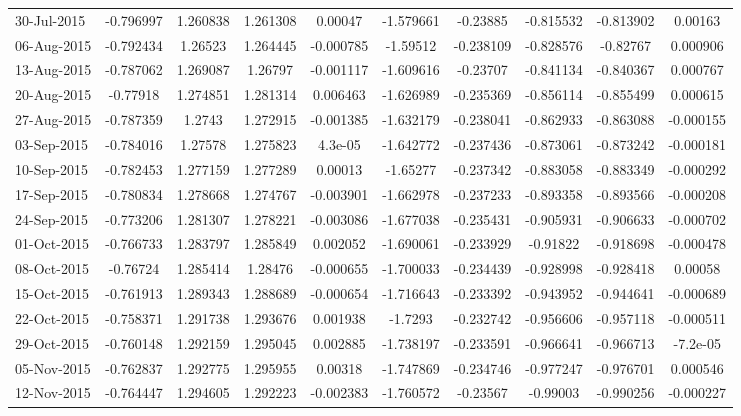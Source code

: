 \documentclass[letterpaper,11pt]{article}
\newcommand{\?}{\stackrel{?}{=}}
\begin{document}
\begin{table}[htbp]
\begin{adjustbox}{width=1.2\textwidth,center=\textwidth}
\begin{tabular}{ l  *9c }
30-Jul-2015 & -0.796997 & 1.260838 & 1.261308 & 0.00047 & -1.579661 & -0.23885 & -0.815532 & -0.813902 & 0.00163 \\
\rowcolor{black!10}06-Aug-2015 & -0.792434 & 1.26523 & 1.264445 & -0.000785 & -1.59512 & -0.238109 & -0.828576 & -0.82767 & 0.000906 \\
13-Aug-2015 & -0.787062 & 1.269087 & 1.26797 & -0.001117 & -1.609616 & -0.23707 & -0.841134 & -0.840367 & 0.000767 \\
\rowcolor{black!10}20-Aug-2015 & -0.77918 & 1.274851 & 1.281314 & 0.006463 & -1.626989 & -0.235369 & -0.856114 & -0.855499 & 0.000615 \\
27-Aug-2015 & -0.787359 & 1.2743 & 1.272915 & -0.001385 & -1.632179 & -0.238041 & -0.862933 & -0.863088 & -0.000155 \\
\rowcolor{black!10}03-Sep-2015 & -0.784016 & 1.27578 & 1.275823 & 4.3e-05 & -1.642772 & -0.237436 & -0.873061 & -0.873242 & -0.000181 \\
10-Sep-2015 & -0.782453 & 1.277159 & 1.277289 & 0.00013 & -1.65277 & -0.237342 & -0.883058 & -0.883349 & -0.000292 \\
\rowcolor{black!10}17-Sep-2015 & -0.780834 & 1.278668 & 1.274767 & -0.003901 & -1.662978 & -0.237233 & -0.893358 & -0.893566 & -0.000208 \\
24-Sep-2015 & -0.773206 & 1.281307 & 1.278221 & -0.003086 & -1.677038 & -0.235431 & -0.905931 & -0.906633 & -0.000702 \\
\rowcolor{black!10}01-Oct-2015 & -0.766733 & 1.283797 & 1.285849 & 0.002052 & -1.690061 & -0.233929 & -0.91822 & -0.918698 & -0.000478 \\
08-Oct-2015 & -0.76724 & 1.285414 & 1.28476 & -0.000655 & -1.700033 & -0.234439 & -0.928998 & -0.928418 & 0.00058 \\
\rowcolor{black!10}15-Oct-2015 & -0.761913 & 1.289343 & 1.288689 & -0.000654 & -1.716643 & -0.233392 & -0.943952 & -0.944641 & -0.000689 \\
22-Oct-2015 & -0.758371 & 1.291738 & 1.293676 & 0.001938 & -1.7293 & -0.232742 & -0.956606 & -0.957118 & -0.000511 \\
\rowcolor{black!10}29-Oct-2015 & -0.760148 & 1.292159 & 1.295045 & 0.002885 & -1.738197 & -0.233591 & -0.966641 & -0.966713 & -7.2e-05 \\
05-Nov-2015 & -0.762837 & 1.292775 & 1.295955 & 0.00318 & -1.747869 & -0.234746 & -0.977247 & -0.976701 & 0.000546 \\
\rowcolor{black!10}12-Nov-2015 & -0.764447 & 1.294605 & 1.292223 & -0.002383 & -1.760572 & -0.23567 & -0.99003 & -0.990256 & -0.000227 \\

\end{tabular}
\end{adjustbox}
\end{table}
\end{document}
